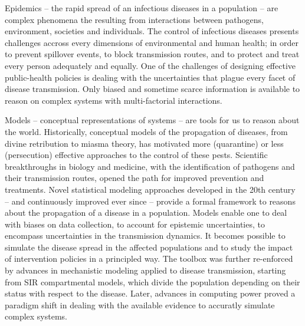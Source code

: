 Epidemics -- the rapid spread of an infectious diseases in a population -- are  complex phenomena the resulting from interactions between pathogens, environment, societies and individuals\cite{Rinaldo:RiverNetworksEcological:2020a, Buckee:ThinkingClearlySocial:2021, Heesterbeek:ModelingInfectiousDisease:2015}. The control of infectious diseases presents challenges accross every dimensions of environmental and human health; in order to prevent spillover events, to block transmission routes, and to protect and treat every person adequately and equally. %
 One of the challenges of designing effective public-health policies is dealing with the uncertainties that plague every facet of disease transmission. Only biased and sometime scarce information is available to reason on complex systems with multi-factorial interactions.

Models -- conceptual representations of systems -- are tools for us to reason about the world. Historically, conceptual models of the propagation of diseases, from divine retribution to miasma theory, has motivated more (quarantine) or less (persecution) effective approaches to the control of these pests. Scientific breakthroughs in biology and medicine, with the identification of pathogens and their transmission routes, opened the path for improved prevention and treatments. Novel statistical modeling approaches\cite[-3\baselineskip]{Freedman:AssociationCausationRemarks:1999} developed in the 20th century -- and continuously improved ever since\cite{Gelman:WhatAreMost:2021} --  provide a formal framework to reasons about the propagation of a disease in a population. Models enable one to deal with biases on data collection, to account for epistemic uncertainties, to encompass uncertainties in the transmission dynamics. It becomes possible to simulate the disease spread in the affected populations and to study the impact of intervention policies in a principled way. The toolbox was further re-enforced by advances in mechanistic modeling applied to disease transmission, starting from SIR compartmental models\cite{Kermack:ContributionMathematicalTheory:1927, Anderson:PopulationBiologyInfectious:1979}, which divide the population depending on their status with respect to the disease. Later, advances in computing power proved a paradigm shift in dealing with the available evidence to accuratly simulate complex systems.

